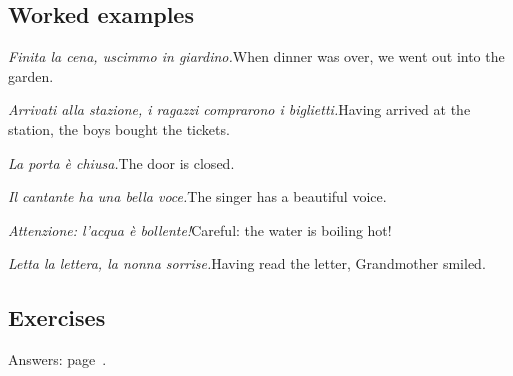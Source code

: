\documentclass[11pt,a4paper,twoside,openright]{book}
\begin{document}
\subsection*{Worked examples}
\begin{examples}
\item\relax \textit{Finita la cena, uscimmo in giardino.}\newline When dinner was over, we went out into the garden.
\item\relax \textit{Arrivati alla stazione, i ragazzi comprarono i biglietti.}\newline Having arrived at the station, the boys bought the tickets.
\item\relax \textit{La porta è chiusa.}\newline The door is closed.
\item\relax \textit{Il cantante ha una bella voce.}\newline The singer has a beautiful voice.
\item\relax \textit{Attenzione: l'acqua è bollente!}\newline Careful: the water is boiling hot!
\item\relax \textit{Letta la lettera, la nonna sorrise.}\newline Having read the letter, Grandmother smiled.
\end{examples}

\subsection*{Exercises}\label{les:participio:exercises}
{\color{muted}\small Answers: page~\pageref{ans:participio}.}
\end{document}
